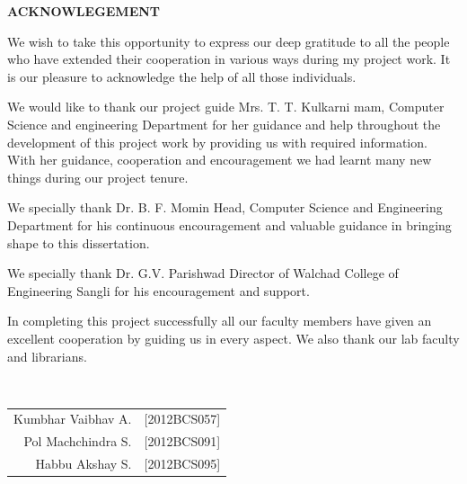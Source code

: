 \documentclass{article}
\begin{document}




\newpage
{
\tableofcontents
}
\newpage
\listoffigures









\newpage
\begin{center}
{\LARGE \textbf{ ACKNOWLEGEMENT}}\\[1cm]
\end{center}
{\Large
	\par We wish to take this opportunity to express our deep gratitude to all the people who have 
extended their cooperation in various ways during my project work. It is our pleasure to acknowledge 
the help of all those individuals. 
	\par We would like to thank our project guide Mrs. T. T. Kulkarni mam, Computer Science and 
engineering Department for her guidance and help throughout the development of this project work 
by providing us with required information. With her guidance, cooperation and encouragement we 
had learnt many new things during our project tenure. 
	\par We specially thank Dr. B. F. Momin Head, Computer Science and Engineering Department for 
his continuous encouragement and valuable guidance in bringing shape to this dissertation. 
	\par  We specially thank Dr. G.V. Parishwad Director of Walchad College of Engineering Sangli for 
his encouragement and support.  
	\par In completing this project successfully all our faculty members have given an excellent 
cooperation by guiding us in every aspect. We also thank our lab faculty and librarians.
}\\[1cm]
\vfill

\begin{flushright}
\begin{minipage}{.5\linewidth}

\begin{tabular}{rr}
	\large Kumbhar Vaibhav A. &\large [2012BCS057]\\
	\large Pol Machchindra  S. &\large [2012BCS091] \\
	\large Habbu Akshay S. &\large [2012BCS095]\\
\end{tabular}
\end{minipage}
\end{flushright}
\end{document}

